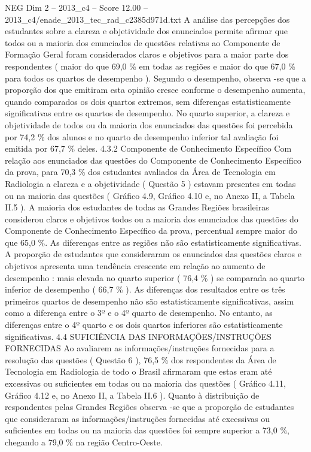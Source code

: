 \begin{textsample}{NEG Dim 2 – 2013\_c4 – Score 12.00 – 2013\_c4/enade\_2013\_tec\_rad\_c2385d971d.txt}
A análise das percepções dos estudantes sobre a clareza e objetividade dos enunciados permite afirmar que todos ou a maioria dos enunciados de questões relativas ao Componente de Formação Geral foram considerados claros e objetivos para a maior parte dos respondentes ( maior do que 69,0 \% em todas as regiões e maior do que 67,0 \% para todos os quartos de desempenho ).
Segundo o desempenho, observa -se que a proporção dos que emitiram esta opinião cresce conforme o desempenho aumenta, quando comparados os dois quartos extremos, sem diferenças estatisticamente significativas entre os quartos de desempenho.
No quarto superior, a clareza e objetividade de todos ou da maioria dos enunciados das questões foi percebida por 74,2 \% dos alunos e no quarto de desempenho inferior tal avaliação foi emitida por 67,7 \% deles. 4.3.2 Componente de Conhecimento Específico Com relação aos enunciados das questões do Componente de Conhecimento Específico da prova, para 70,3 \% dos estudantes avaliados da Área de Tecnologia em Radiologia a clareza e a objetividade ( Questão 5 ) estavam presentes em todas ou na maioria das questões ( Gráfico 4.9, Gráfico 4.10 e, no Anexo II, a Tabela II.5 ).
A maioria dos estudantes de todas as Grandes Regiões brasileiras considerou claros e objetivos todos ou a maioria dos enunciados das questões do Componente de Conhecimento Específico da prova, percentual sempre maior do que 65,0 \%.
As diferenças entre as regiões não são estatisticamente significativas.
A proporção de estudantes que consideraram os enunciados das questões claros e objetivos apresenta uma tendência crescente em relação ao aumento de desempenho : mais elevada no quarto superior ( 76,4 \% ) se comparada ao quarto inferior de desempenho ( 66,7 \% ).
As diferenças dos resultados entre os três primeiros quartos de desempenho não são estatisticamente significativas, assim como a diferença entre o 3º e o 4º quarto de desempenho.
No entanto, as diferenças entre o 4º quarto e os dois quartos inferiores são estatisticamente significativas. 4.4 SUFICIÊNCIA DAS INFORMAÇÕES/INSTRUÇÕES FORNECIDAS Ao avaliarem as informações/instruções fornecidas para a resolução das questões ( Questão 6 ), 76,5 \% dos respondentes da Área de Tecnologia em Radiologia de todo o Brasil afirmaram que estas eram até excessivas ou suficientes em todas ou na maioria das questões ( Gráfico 4.11, Gráfico 4.12 e, no Anexo II, a Tabela II.6 ).
Quanto à distribuição de respondentes pelas Grandes Regiões observa -se que a proporção de estudantes que consideraram as informações/instruções fornecidas até excessivas ou suficientes em todas ou na maioria das questões foi sempre superior a 73,0 \%, chegando a 79,0 \% na região Centro-Oeste.

\end{textsample}
